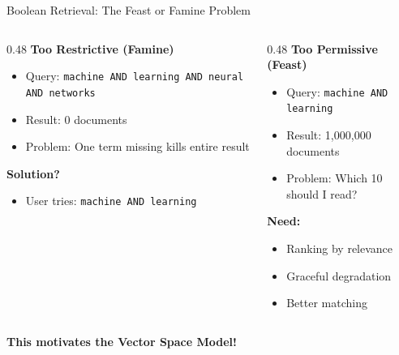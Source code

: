 \documentclass[aspectratio=169]{beamer}
\newif\ifanimated
\newcommand{\cpause}{\ifanimated\pause\fi}
\begin{document}
\begin{frame}{Boolean Retrieval: The Feast or Famine Problem}
\begin{columns}
\begin{column}{0.48\textwidth}
\textbf{Too Restrictive (Famine)}
\begin{itemize}
    \item Query: \texttt{machine AND learning AND neural AND networks}
    \item Result: 0 documents
    \item Problem: One term missing kills entire result
\end{itemize}
\cpause
\vspace{1em}

\textbf{Solution?}
\begin{itemize}
    \item User tries: \texttt{machine AND learning}
\end{itemize}
\cpause
\end{column}

\begin{column}{0.48\textwidth}
\textbf{Too Permissive (Feast)}
\begin{itemize}
    \item Query: \texttt{machine AND learning}
    \item Result: 1,000,000 documents
    \item Problem: Which 10 should I read?
\end{itemize}
\cpause
\vspace{1em}

\textbf{Need:}
\begin{itemize}
    \item Ranking by relevance
    \item Graceful degradation
    \item Better matching
\end{itemize}
\end{column}
\end{columns}

\vspace{1em}

\begin{center}
\textbf{This motivates the Vector Space Model!}
\end{center}
\end{frame}

\end{document}

